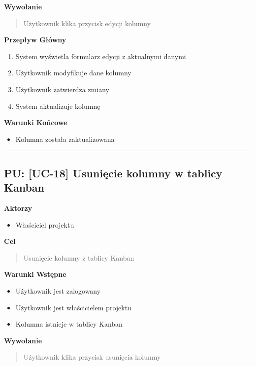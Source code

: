 \vspace{0.2cm}
\noindent\textbf{Wywołanie}
\begin{quote}
    Użytkownik klika przycisk edycji kolumny
\end{quote}

\vspace{0.2cm}
\noindent\textbf{Przepływ Główny}
\begin{enumerate}
    \item System wyświetla formularz edycji z aktualnymi danymi
    \item Użytkownik modyfikuje dane kolumny
    \item Użytkownik zatwierdza zmiany
    \item System aktualizuje kolumnę
\end{enumerate}

\vspace{0.2cm}
\noindent\textbf{Warunki Końcowe}
\begin{itemize}
    \item Kolumna została zaktualizowana
\end{itemize}


\hrule
\vspace{1cm}

\subsection*{PU: [UC-18] Usunięcie kolumny w tablicy Kanban}

\noindent\textbf{Aktorzy}
\begin{itemize}
    \item Właściciel projektu
\end{itemize}

\vspace{0.2cm}
\noindent\textbf{Cel}
\begin{quote}
    Usunięcie kolumny z tablicy Kanban
\end{quote}

\vspace{0.2cm}
\noindent\textbf{Warunki Wstępne}
\begin{itemize}
    \item Użytkownik jest zalogowany
    \item Użytkownik jest właścicielem projektu
    \item Kolumna istnieje w tablicy Kanban
\end{itemize}

\vspace{0.2cm}
\noindent\textbf{Wywołanie}
\begin{quote}
    Użytkownik klika przycisk usunięcia kolumny
\end{quote}

